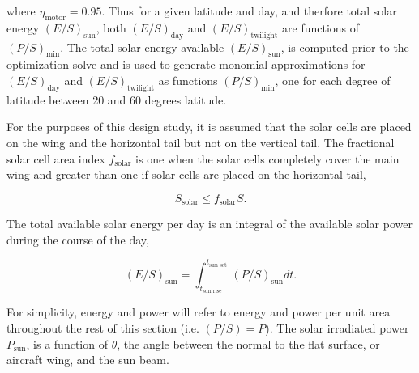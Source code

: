 where $\eta_{\text{motor}} = 0.95$. Thus for a given latitude and day, and therfore total solar energy $(E/S)_{\text{sun}}$, both $(E/S)_{\text{day}}$ and $(E/S)_{\text{twilight}}$ are functions of $(P/S)_{\text{min}}$.  
The total solar energy available $(E/S)_{\text{sun}}$, is computed prior to the optimization solve and is used to generate monomial approximations for $(E/S)_{\text{day}}$ and $(E/S)_{\text{twilight}}$ as functions $(P/S)_{\text{min}}$, one for each degree of latitude between 20 and 60 degrees latitude. 
% 

For the purposes of this design study, it is assumed that the solar cells are placed on the wing and the horizontal tail but not on the vertical tail. 
The fractional solar cell area index $f_{\text{solar}}$ is one when the solar cells completely cover the main wing and greater than one if solar cells are placed on the horizontal tail,

\begin{equation}
    \label{e:solarssolar}
    S_{\text{solar}} \leq f_{\text{solar}}S.
\end{equation}

The total available solar energy per day is an integral of the available solar power during the course of the day,

    \begin{equation}
        \label{e:solares}
        (E/S)_{\text{sun}} = \int_{t_{\text{sun rise}}}^{t_{\text{sun set}}} (P/S)_{\text{sun}} dt.
    \end{equation}
    
For simplicity, energy and power will refer to energy and power per unit area throughout the rest of this section (i.e. $(P/S) = P$). 
The solar irradiated power $P_{\text{sun}}$, is a function of $\theta$, the angle between the normal to the flat surface, or aircraft wing, and the sun beam.\cite{solar}

